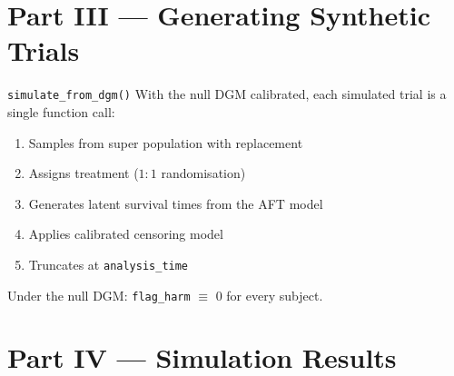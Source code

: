 \documentclass[
  11pt,
  ignorenonframetext,
  aspectratio=169,
]{beamer}
\providecommand{\tightlist}{%
  \setlength{\itemsep}{0pt}\setlength{\parskip}{0pt}}
\begin{document}
\section{Part III --- Generating Synthetic
Trials}\label{part-iii-generating-synthetic-trials}

\begin{frame}[fragile]{\texttt{simulate\_from\_dgm()}}
\label{simulate_from_dgm}
With the null DGM calibrated, each simulated trial is a single function
call:

\begin{enumerate}
\tightlist
\item
  Samples from super population with replacement
\item
  Assigns treatment (\(1{:}1\) randomisation)
\item
  Generates latent survival times from the AFT model
\item
  Applies calibrated censoring model
\item
  Truncates at \texttt{analysis\_time}
\end{enumerate}

Under the null DGM: \texttt{flag\_harm} \(\equiv\) 0 for every subject.
\end{frame}

\section{Part IV --- Simulation
Results}\label{part-iv-simulation-results}
\end{document}
